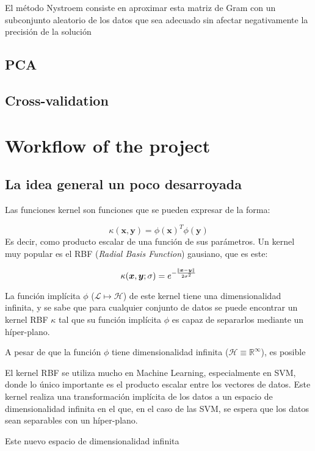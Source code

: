 \documentclass{article}
\newcommand{\reals}{\mathds{R}}
\newcommand{\vx}{\bm{x}}
\newcommand{\vy}{\bm{y}}
\newcommand{\eng}[1]{\textit{#1}}
\begin{document}
El método Nystroem consiste en aproximar esta matriz de Gram con un subconjunto
aleatorio de los datos que sea adecuado sin afectar negativamente la precisión
de la solución
\subsection{PCA}
\subsection{Cross-validation}

\section{Workflow of the project}
\subsection{La idea general un poco desarroyada}

Las funciones kernel son funciones que se pueden expresar de la forma:

\begin{equation}
   \kappa(\vx, \vy) = \phi(\vx)^T\phi(\vy)
\end{equation}
Es decir, como producto escalar de una función de sus parámetros. Un kernel muy
popular es el RBF (\eng{Radial Basis Function}) gausiano, que es este:

\begin{equation}
 \kappa({\vx, \vy}; \sigma) = e^{-\frac{\norm{\vx - \vy}}{2\sigma^2}}
\end{equation}

La función implícita $\phi$ ($\mathcal{L} \mapsto \mathcal{H}$) de este kernel
tiene una dimensionalidad infinita, y se sabe que para cualquier conjunto de
datos se puede encontrar un kernel RBF $\kappa$ tal que su función implícita
$\phi$ es capaz de separarlos mediante un híper-plano.

A pesar de que la función $\phi$ tiene dimensionalidad infinita
($\mathcal{H} \equiv \reals^\infty$), es posible

El kernel RBF se utiliza mucho en Machine Learning, especialmente en SVM, donde
lo único importante es el producto escalar entre los vectores de datos. Este
kernel realiza una transformación implícita de los datos a un espacio de
dimensionalidad infinita en el que, en el caso de las SVM, se espera que los
datos sean separables con un híper-plano.

Este nuevo espacio de dimensionalidad infinita
\end{document}
